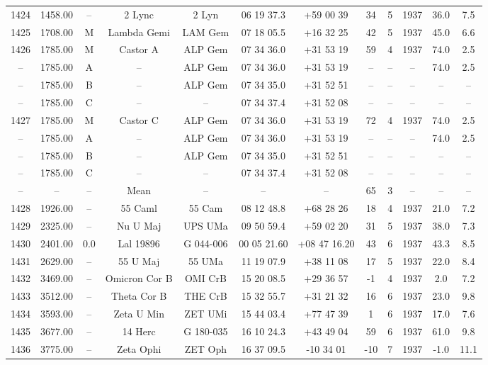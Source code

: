 \begin{table}
\begin{tabular}{cccccccccccc}
1424 & 1458.00 & -- & 2 Lync & 2 Lyn & 06 19 37.3 & +59 00 39 & 34 & 5 & 1937 & 36.0 & 7.5 \\
1425 & 1708.00 & M & Lambda Gemi & LAM Gem & 07 18 05.5 & +16 32 25 & 42 & 5 & 1937 & 45.0 & 6.6 \\
1426 & 1785.00 & M & Castor A & ALP Gem & 07 34 36.0 & +31 53 19 & 59 & 4 & 1937 & 74.0 & 2.5 \\
-- & 1785.00 & A & -- & ALP Gem & 07 34 36.0 & +31 53 19 & -- & -- & -- & 74.0 & 2.5 \\
-- & 1785.00 & B & -- & ALP Gem & 07 34 35.0 & +31 52 51 & -- & -- & -- & -- & -- \\
-- & 1785.00 & C & -- & -- & 07 34 37.4 & +31 52 08 & -- & -- & -- & -- & -- \\
1427 & 1785.00 & M & Castor C & ALP Gem & 07 34 36.0 & +31 53 19 & 72 & 4 & 1937 & 74.0 & 2.5 \\
-- & 1785.00 & A & -- & ALP Gem & 07 34 36.0 & +31 53 19 & -- & -- & -- & 74.0 & 2.5 \\
-- & 1785.00 & B & -- & ALP Gem & 07 34 35.0 & +31 52 51 & -- & -- & -- & -- & -- \\
-- & 1785.00 & C & -- & -- & 07 34 37.4 & +31 52 08 & -- & -- & -- & -- & -- \\
-- & -- & -- & Mean & -- & -- & -- & 65 & 3 & -- & -- & -- \\
1428 & 1926.00 & -- & 55 Caml & 55 Cam & 08 12 48.8 & +68 28 26 & 18 & 4 & 1937 & 21.0 & 7.2 \\
1429 & 2325.00 & -- & Nu U Maj & UPS UMa & 09 50 59.4 & +59 02 20 & 31 & 5 & 1937 & 38.0 & 7.3 \\
1430 & 2401.00 & 0.0 & Lal 19896 & G 044-006 & 00 05 21.60 & +08 47 16.20 & 43 & 6 & 1937 & 43.3 & 8.5 \\
1431 & 2629.00 & -- & 55 U Maj & 55 UMa & 11 19 07.9 & +38 11 08 & 17 & 5 & 1937 & 22.0 & 8.4 \\
1432 & 3469.00 & -- & Omicron Cor B & OMI CrB & 15 20 08.5 & +29 36 57 & -1 & 4 & 1937 & 2.0 & 7.2 \\
1433 & 3512.00 & -- & Theta Cor B & THE CrB & 15 32 55.7 & +31 21 32 & 16 & 6 & 1937 & 23.0 & 9.8 \\
1434 & 3593.00 & -- & Zeta U Min & ZET UMi & 15 44 03.4 & +77 47 39 & 1 & 6 & 1937 & 17.0 & 7.6 \\
1435 & 3677.00 & -- & 14 Herc & G 180-035 & 16 10 24.3 & +43 49 04 & 59 & 6 & 1937 & 61.0 & 9.8 \\
1436 & 3775.00 & -- & Zeta Ophi & ZET Oph & 16 37 09.5 & -10 34 01 & -10 & 7 & 1937 & -1.0 & 11.1 \\

\end{tabular}
\end{table}
